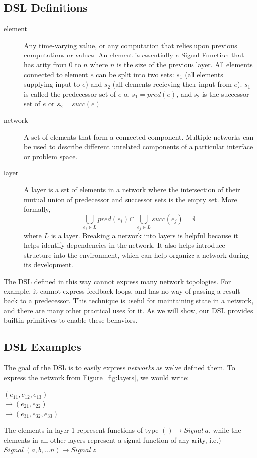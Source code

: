 \documentclass[twocolumn,11pt,english]{article}
\begin{document}
\subsection{DSL Definitions}
\begin{description}

\item[element] Any time-varying value, or any computation that relies upon previous computations or values. An element is essentially a Signal Function that has arity from 0 to $n$ where $n$ is the size of the previous layer. All elements connected to element $e$ can be split into two sets: $s_1$ (all elements supplying input to $e$) and $s_2$ (all elements recieving their input from $e$). $s_1$ is called the predecessor set of $e$ or $s_1 = pred(e)$, and $s_2$ is the successor set of $e$ or $s_2 = succ(e)$

\item[network] A set of elements that form a connected component. Multiple networks can be used to describe different unrelated components of a particular interface or problem space.

\item[layer] A layer is a set of elements in a network where the intersection of their mutual union of predecessor and successor sets is the empty set. More formally,
\begin{equation}
  \bigcup_{e_i \in L}{pred(e_i)} \cap \bigcup_{e_j \in L}{succ(e_j)} = \emptyset
\end{equation}
where $L$ is a layer. Breaking a network into layers is helpful because it helps identify dependencies in the network. It also helps introduce structure into the environment, which can help organize a network during its development. 

\end{description}

The DSL defined in this way cannot express many network topologies. For example, it cannot express feedback loops, and has no way of passing a result back to a predecessor. This technique is useful for maintaining state in a network, and there are many other practical uses for it. As we will show, our DSL provides builtin primitives to enable these behaviors. 

\subsection{DSL Examples}
The goal of the DSL is to easily express \textit{networks} as we've defined them. To express the network from Figure~\ref{fig:layers}, we would write:
\begin{center}
$(e_{11}, e_{12}, e_{13})$
\\ $\rightarrow (e_{21}, e_{22})$
\\ $\rightarrow (e_{31}, e_{32}, e_{33})$
\end{center}
The elements in layer 1 represent functions of type $() \rightarrow Signal~a$, while the elements in all other layers represent a signal function of any arity, i.e.) $Signal~(a, b, ... n) \rightarrow Signal~z$
\end{document}
